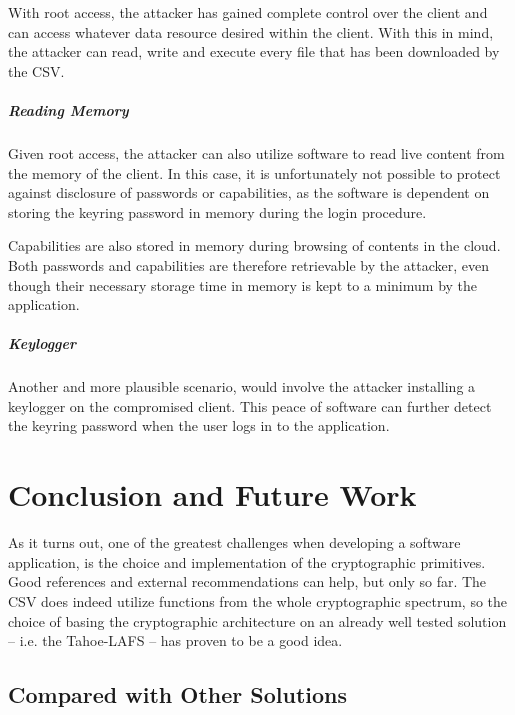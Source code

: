 \documentclass[pdftex,english,10pt,b5paper,twoside]{book}
\begin{document}
With root access, the attacker has gained complete control over the client and
can access whatever data resource desired within the client. With this in mind,
the attacker can read, write and execute every file that has been downloaded by
the \acl{CSV}.

\paragraph{Reading Memory} Given root access, the attacker can also utilize
software to read live content from the memory of the client. In this case, it
is unfortunately not possible to protect against disclosure of passwords or
capabilities, as the software is dependent on storing the keyring password in
memory during the login procedure.

Capabilities are also stored in memory during browsing of contents in the
cloud. Both passwords and capabilities are therefore retrievable by the
attacker, even though their necessary storage time in memory is kept to a
minimum by the application. 

\paragraph{Keylogger} Another and more plausible scenario, would involve the
attacker installing a keylogger on the compromised client. This peace of
software can further detect the keyring password when the user logs in to the
application.

\chapter{Conclusion and Future Work}
\label{ch:conclusion}

As it turns out, one of the greatest challenges when developing a software
application, is the choice and implementation of the cryptographic primitives.
Good references and external recommendations can help, but only so far.
The \ac{CSV} does indeed utilize functions from the whole cryptographic
spectrum, so the choice of basing the cryptographic architecture on an already
well tested solution -- i.e. the Tahoe-\ac{LAFS} -- has proven to be a good
idea.

\section{Compared with Other Solutions}


\end{document}
